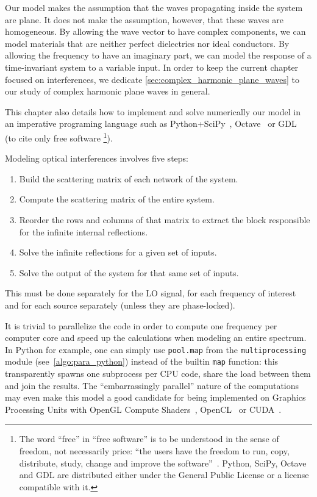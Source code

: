 Our model makes the assumption that the waves propagating inside the system are plane.
It does not make the assumption, however, that these waves are homogeneous.
By allowing the wave vector to have complex components, we can model materials that are neither perfect dielectrics nor ideal conductors.
By allowing the frequency to have an imaginary part, we can model the response of a time-invariant system to a variable input.
In order to keep the current chapter focused on interferences,
we dedicate \cref{sec:complex_harmonic_plane_waves} to our study of complex harmonic plane waves in general.

This chapter also details how to implement and solve numerically our model in an imperative programing language such as Python+SciPy~\parencite{python,scipy}, Octave~\parencite{octave:2014} or GDL~\parencite{gnudatalanguage}
(to cite only free software%
\footnote{
   The word ``free'' in ``free software'' is to be understood in the sense of freedom, not necessarily price: ``the users have the freedom to run, copy, distribute, study, change and improve the software''~\parencite{gplv3}.
   Python, SciPy, Octave and GDL are distributed either under the General Public License or a license compatible with it.
}).

\begin{samepage}
\noindent
Modeling optical interferences involves five steps:
\begin{enumerate}[noitemsep]
    \item Build the scattering matrix of each network of the system.
    \item Compute the scattering matrix of the entire system.
    \item Reorder the rows and columns of that matrix to extract the block responsible for the infinite internal reflections.
    \item Solve the infinite reflections for a given set of inputs.
    \item Solve the output of the system for that same set of inputs.
\end{enumerate}
This must be done separately for the LO signal, for each frequency of interest and for each source separately (unless they are phase-locked).
\end{samepage}

It is trivial to parallelize the code in order to compute one frequency per computer core and speed up the calculations when modeling an entire spectrum.
In Python for example, one can simply use \texttt{pool.map} from the \texttt{multiprocessing} module (see~\cref{algo:para_python}) instead of the builtin \texttt{map} function: this transparently spawns one subprocess per CPU code, share the load between them and join the results.
The ``embarrassingly parallel'' nature of the computations may even make this model a good candidate for being implemented on Graphics Processing Units
with OpenGL Compute Shaders~\parencite{opengl44},
OpenCL~\parencite{opencl2}
or CUDA~\parencite{cuda}.

